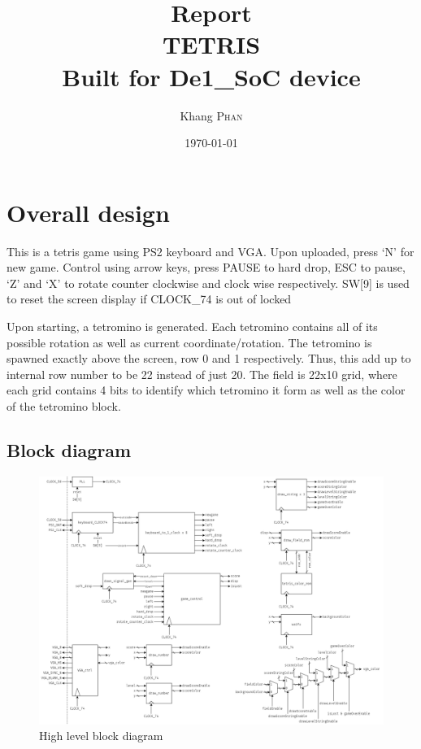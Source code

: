 \documentclass[scale = 0.9]{article}
\title{Report \\ TETRIS \\ Built for De1\_SoC device} %
\author{Khang \textsc{Phan}} %
\date{\today} %
\let\oldsection\section
\renewcommand\section{\clearpage\oldsection}
\begin{document}
\maketitle %



\section{Overall design}
This is a tetris game using PS2 keyboard and VGA. Upon uploaded, press `N' for new game. 
Control using arrow keys, press PAUSE to hard drop, ESC to pause, `Z' and `X' to rotate 
counter clockwise and clock wise respectively. SW[9] is used to reset the screen display
if CLOCK\_74 is out of locked

Upon starting, a tetromino is generated. Each tetromino contains all of its possible 
rotation as well as current coordinate/rotation. The tetromino is spawned exactly above
the screen, row 0 and 1 respectively. Thus, this add up to internal row number to be
22 instead of just 20. The field is 22x10 grid, where each grid contains 4 bits to identify
which tetromino it form as well as the color of the tetromino block.
\subsection{Block diagram}
\begin{figure}[H]
  \begin{center}
    \includegraphics[width=\textwidth]{blockdiagram.png}
    \caption{High level block diagram}\label{blockdiagram}
  \end{center}
\end{figure}
\end{document}
